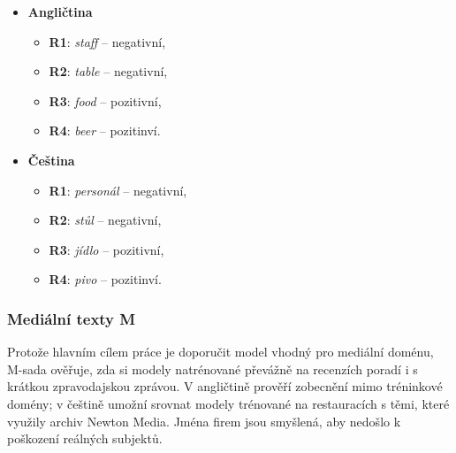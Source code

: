 \begin{itemize}
    \item \textbf{Angličtina} \\
    \begin{itemize}
        \item \textbf{R1}: \emph{staff} -- negativní,
        \item \textbf{R2}: \emph{table} -- negativní,
        \item \textbf{R3}: \emph{food} -- pozitivní,
        \item \textbf{R4}: \emph{beer} -- pozitinví.
    \end{itemize}
    \vspace{1cm}
    \item \textbf{Čeština} \\
    \begin{itemize}
        \item \textbf{R1}: \emph{personál} -- negativní,
        \item \textbf{R2}: \emph{stůl} -- negativní,
        \item \textbf{R3}: \emph{jídlo} -- pozitivní,
        \item \textbf{R4}: \emph{pivo} -- pozitinví.
    \end{itemize}
\end{itemize}

\subsubsection{Mediální texty M}
Protože hlavním cílem práce je doporučit model vhodný pro mediální doménu, M-sada ověřuje, zda si modely natrénované převážně na recenzích poradí i s krátkou zpravodajskou zprávou. V angličtině prověří zobecnění mimo tréninkové domény; v češtině umožní srovnat modely trénované na restauracích s těmi, které využily archiv Newton Media. Jména firem jsou smyšlená, aby nedošlo k poškození reálných subjektů.

